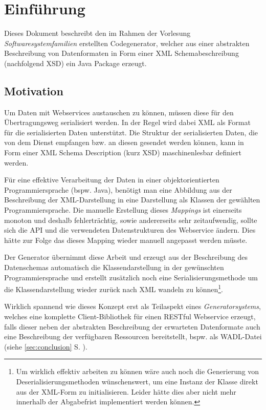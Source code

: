 \section{Einführung}

Dieses Dokument beschreibt den im Rahmen der Vorlesung \emph{Softwaresystemfamilien} erstellten Codegenerator, welcher aus einer abstrakten Beschreibung von Datenformaten in Form einer \gls{XML} Schemabeschreibung (nachfolgend \gls{XSD}) ein Java Package erzeugt.

\subsection{Motivation}
\label{sec:motivation}

Um Daten mit Webservices austauschen zu können, müssen diese für den Übertragungsweg serialisiert werden. In der Regel wird dabei \gls{XML} als Format für die serialisierten Daten unterstützt. Die Struktur der serialisierten Daten, die von dem Dienst empfangen bzw. an diesen gesendet werden können, kann in Form einer XML Schema Description (kurz \gls{XSD}) maschinenlesbar definiert werden.

Für eine effektive Verarbeitung der Daten in einer objektorientierten Programmiersprache (bspw. Java), benötigt man eine Abbildung aus der Beschreibung der XML-Darstellung in eine Darstellung als Klassen der gewählten Programmiersprache. Die manuelle Erstellung dieses \emph{Mappings} ist einerseits monoton und deshalb fehlerträchtig, sowie andererseits sehr zeitaufwendig, sollte sich die API und die verwendeten Datenstrukturen des Webservice ändern. Dies hätte zur Folge das dieses Mapping wieder manuell angepasst werden müsste.

Der Generator übernimmt diese Arbeit und erzeugt aus der Beschreibung des Datenschemas automatisch die Klassendarstellung in der gewünschten Programmiersprache und erstellt zusätzlich noch eine Serialisierungsmethode um die Klassendarstellung wieder zurück nach \gls{XML} wandeln zu können\footnote{Um wirklich effektiv arbeiten zu können wäre auch noch die Generierung von Deserialisierungsmethoden wünschenswert, um eine Instanz der Klasse direkt aus der \gls{XML}-Form zu initialisieren. Leider hätte dies aber nicht mehr innerhalb der Abgabefrist implementiert werden können.}.

Wirklich spannend wie dieses Konzept erst als Teilaspekt eines \emph{Generatorsystems}, welches eine komplette Client-Bibliothek für einen \gls{RESTful} Webservice erzeugt, falls dieser neben der abstrakten Beschreibung der erwarteten Datenformate auch eine Beschreibung der verfügbaren Ressourcen bereitstellt, bspw. als \gls{WADL}-Datei (siehe \cref{sec:conclusion} S. \pageref{sec:conclusion}).

